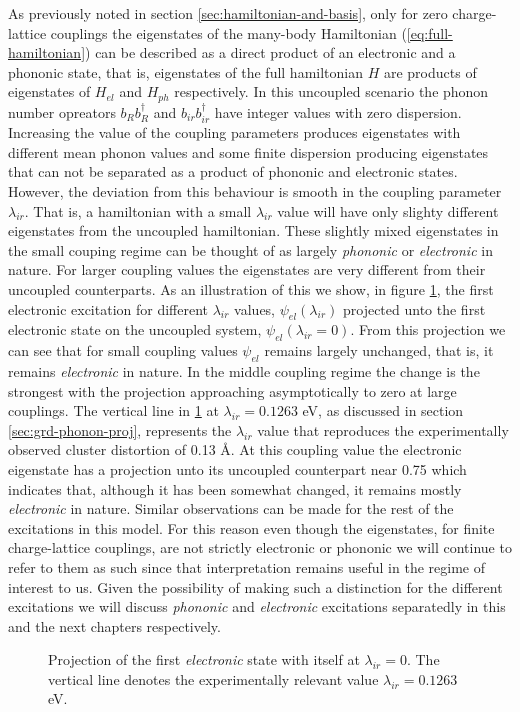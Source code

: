 As previously noted in section \ref{sec:hamiltonian-and-basis}, only for zero charge-lattice couplings the eigenstates of the many-body Hamiltonian (\ref{eq:full-hamiltonian}) can be described as a direct product of an electronic and a phononic state, that is, eigenstates of the full hamiltonian $H$ are products of eigenstates of $H_{el}$ and $H_{ph}$ respectively.
In this uncoupled scenario the phonon number opreators $b_Rb^\dagger_R$ and $b_{ir}b^\dagger_{ir}$ have integer values with zero dispersion.
Increasing the value of the coupling parameters produces eigenstates with different mean phonon values and some finite dispersion producing eigenstates that can not be separated as a product of phononic and electronic states.
However, the deviation from this behaviour is smooth in the coupling parameter $\lambda_{ir}$.
That is, a hamiltonian with a small $\lambda_{ir}$ value will have only slighty different eigenstates from the uncoupled hamiltonian.
These slightly mixed eigenstates in the small couping regime can be thought of as largely \textit{phononic} or \textit{electronic} in nature.
For larger coupling values the eigenstates are very different from their uncoupled counterparts.
As an illustration of this we show, in figure \ref{fig:electr-proj}, the first electronic excitation for different $\lambda_{ir}$ values, $\psi_{el}(\lambda_{ir})$ projected unto the first electronic state on the uncoupled system, $\psi_{el}(\lambda_{ir}=0)$.
From this projection we can see that for small coupling values $\psi_{el}$ remains largely unchanged, that is, it remains \textit{electronic} in nature.
In the middle coupling regime the change is the strongest with the projection approaching asymptotically to zero at large couplings.
The vertical line in \ref{fig:electr-proj} at $\lambda_{ir}=0.1263$ eV, as discussed in section \ref{sec:grd-phonon-proj}, represents the $\lambda_{ir}$ value that reproduces the experimentally observed cluster distortion of 0.13 \AA.
At this coupling value the electronic eigenstate has a projection unto its uncoupled counterpart near 0.75 which indicates that, although it has been somewhat changed, it remains mostly \textit{electronic} in nature.
Similar observations can be made for the rest of the excitations in this model.
For this reason even though the eigenstates, for finite charge-lattice couplings, are not strictly electronic or phononic we will continue to refer to them as such since that interpretation remains useful in the regime of interest to us.
Given the possibility of making such a distinction for the different excitations we will discuss \textit{phononic} and \textit{electronic} excitations separatedly in this and the next chapters respectively. 
%
\begin{figure}[ht]
  \centering
  
  \caption[Projection of the first \textit{electronic} state with itself at $\lambda_{ir}=0$.]
  {Projection of the first \textit{electronic} state with itself at $\lambda_{ir}=0$.
    The vertical line denotes the experimentally relevant value $\lambda_{ir}=0.1263$ eV.}
  \label{fig:electr-proj}
\end{figure}

